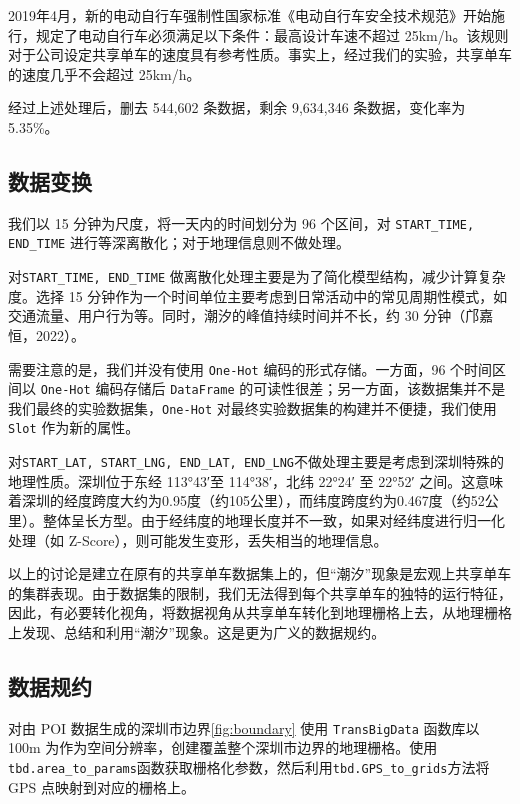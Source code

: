 \documentclass[12pt,a4paper,oneside]{ctexart}
\begin{document}
2019年4月，新的电动自行车强制性国家标准《电动自行车安全技术规范》\cite{GB17761-2018}开始施行，规定了电动自行车必须满足以下条件：最高设计车速不超过 25km/h。该规则对于公司设定共享单车的速度具有参考性质。事实上，经过我们的实验，共享单车的速度几乎不会超过 25km/h。

经过上述处理后，删去 544,602 条数据，剩余 9,634,346 条数据，变化率为 5.35\%。

\subsection{数据变换}

我们以 15 分钟为尺度，将一天内的时间划分为 96 个区间，对 \texttt{START\_TIME, END\_TIME} 进行等深离散化；对于地理信息则不做处理。

对\texttt{START\_TIME, END\_TIME} 做离散化处理主要是为了简化模型结构，减少计算复杂度。选择 15 分钟作为一个时间单位主要考虑到日常活动中的常见周期性模式，如交通流量、用户行为等\cite{吴兵2003城市生命周期}。同时，潮汐的峰值持续时间并不长，约 30 分钟（邝嘉恒，2022\cite{邝嘉恒2022吸引区域优化}）。

需要注意的是，我们并没有使用 \texttt{One-Hot} 编码的形式存储。一方面，96 个时间区间以 \texttt{One-Hot} 编码存储后 \texttt{DataFrame} 的可读性很差；另一方面，该数据集并不是我们最终的实验数据集，\texttt{One-Hot} 对最终实验数据集的构建并不便捷，我们使用 \texttt{Slot} 作为新的属性。

对\texttt{START\_LAT, START\_LNG, END\_LAT, END\_LNG}不做处理主要是考虑到深圳特殊的地理性质。深圳位于东经 113°43′至 114°38′，北纬 22°24′ 至 22°52′ 之间。这意味着深圳的经度跨度大约为0.95度（约105公里），而纬度跨度约为0.467度（约52公里）。整体呈长方型。由于经纬度的地理长度并不一致，如果对经纬度进行归一化处理（如 Z-Score），则可能发生变形，丢失相当的地理信息。

以上的讨论是建立在原有的共享单车数据集上的，但“潮汐”现象是宏观上共享单车的集群表现。由于数据集的限制，我们无法得到每个共享单车的独特的运行特征，因此，有必要转化视角，将数据视角从共享单车转化到地理栅格上去，从地理栅格上发现、总结和利用“潮汐”现象。这是更为广义的数据规约。

\subsection{数据规约}

对由 POI 数据生成的深圳市边界\ref{fig:boundary} 使用 \texttt{TransBigData} 函数库以 100m 为作为空间分辨率，创建覆盖整个深圳市边界的地理栅格。使用\texttt{tbd.area\_to\_params}函数获取栅格化参数，然后利用\texttt{tbd.GPS\_to\_grids}方法将 GPS 点映射到对应的栅格上。
\end{document}
